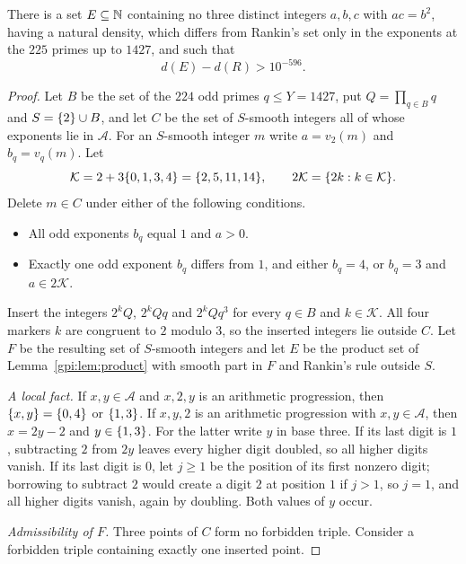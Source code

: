 \begin{theorem}\label{gpi:thm:explicit}
There is a set $E\subseteq\mathbb{N}$ containing no three distinct integers $a,b,c$ with $ac=b^2$,
having a natural density, which differs from Rankin's set only in the exponents at the $225$
primes up to $1427$, and such that
\[
 d(E)-d(R)>10^{-596}.
\]
\end{theorem}

\begin{proof}
Let $B$ be the set of the $224$ odd primes $q\le Y=1427$, put $Q=\prod_{q\in B}q$ and
$S=\{2\}\cup B$, and let $C$ be the set of $S$-smooth integers all of whose exponents lie
in $\mathcal A$. For an $S$-smooth integer $m$ write $a=v_2(m)$ and $b_q=v_q(m)$. Let
\[
 \mathcal K=2+3\{0,1,3,4\}=\{2,5,11,14\},\qquad
 2\mathcal K=\{2k:k\in\mathcal K\}.
\]
Delete $m\in C$ under either of the following conditions.
\begin{itemize}
\item All odd exponents $b_q$ equal $1$ and $a>0$.
\item Exactly one odd exponent $b_q$ differs from $1$, and either $b_q=4$, or $b_q=3$ and
 $a\in2\mathcal K$.
\end{itemize}
Insert the integers $2^kQ$, $2^kQq$ and $2^kQq^3$ for every $q\in B$ and $k\in\mathcal K$.
All four markers $k$ are congruent to $2$ modulo $3$, so the inserted integers lie outside
$C$. Let $F$ be the resulting set of $S$-smooth integers and let $E$ be the product set of
Lemma~\ref{gpi:lem:product} with smooth part in $F$ and Rankin's rule outside $S$.

\emph{A local fact.} If $x,y\in\mathcal A$ and $x,2,y$ is an arithmetic progression, then
$\{x,y\}=\{0,4\}$ or $\{1,3\}$. If $x,y,2$ is an arithmetic progression with
$x,y\in\mathcal A$, then $x=2y-2$ and $y\in\{1,3\}$. For the latter write $y$ in base
three. If its last digit is $1$, subtracting $2$ from $2y$ leaves every higher digit doubled,
so all higher digits vanish. If its last digit is $0$, let $j\ge1$ be the position of its
first nonzero digit; borrowing to subtract $2$ would create a digit $2$ at position $1$ if
$j>1$, so $j=1$, and all higher digits vanish, again by doubling. Both values of $y$ occur.

\emph{Admissibility of $F$.} Three points of $C$ form no forbidden triple. Consider a
forbidden triple containing exactly one inserted point.


\end{proof}
